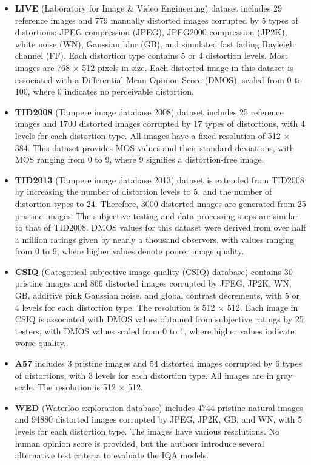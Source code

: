 \vspace{\baselineskip}
\begin{itemize}
    \item \textbf{LIVE} (Laboratory for Image \& Video Engineering) dataset \autocite{LIVE} includes 29 reference images and 779 manually distorted images corrupted by 5 types of distortions: JPEG compression (JPEG), JPEG2000 compression (JP2K), white noise (WN), Gaussian blur (GB), and simulated fast fading Rayleigh channel (FF). Each distortion type contains 5 or 4 distortion levels. Most images are 768 $\times$ 512 pixels in size. Each distorted image in this dataset is associated with a Differential Mean Opinion Score (DMOS), scaled from 0 to 100, where 0 indicates no perceivable distortion. 
    \item \textbf{TID2008} (Tampere image database 2008) dataset \autocite{TID2008} includes 25 reference images and 1700 distorted images corrupted by 17 types of distortions, with 4 levels for each distortion type. All images have a fixed resolution of 512 $\times$ 384. This dataset provides MOS values and their standard deviations, with MOS ranging from 0 to 9, where 9 signifies a distortion-free image.
    \item \textbf{TID2013} (Tampere image database 2013) dataset \autocite{TID2013} is extended from TID2008 \autocite{TID2008} by increasing the number of distortion levels to 5, and the number of distortion types to 24. Therefore, 3000 distorted images are generated from 25 pristine images. The subjective testing and data processing steps are similar to that of TID2008. DMOS values for this dataset were derived from over half a million ratings given by nearly a thousand observers, with values ranging from 0 to 9, where higher values denote poorer image quality.
    \item \textbf{CSIQ} (Categorical subjective image quality (CSIQ) database) \autocite{CSIQ} contains 30 pristine images and 866 distorted images corrupted by JPEG, JP2K, WN, GB, additive pink Gaussian noise, and global contrast decrements, with 5 or 4 levels for each distortion type. The resolution is 512 $\times$ 512. Each image in CSIQ is associated with DMOS values obtained from subjective ratings by 25 testers, with DMOS values scaled from 0 to 1, where higher values indicate worse quality.
    \item \textbf{A57} \autocite{A57} includes 3 pristine images and 54 distorted images corrupted by 6 types of distortions, with 3 levels for each distortion type. All images are in gray scale. The resolution is 512 $\times$ 512. 
    \item \textbf{WED} (Waterloo exploration database) \autocite{WED} includes 4744 pristine natural images and 94880 distorted images corrupted by JPEG, JP2K, GB, and WN, with 5 levels for each distortion type. The images have various resolutions. No human opinion score is provided, but the authors introduce several alternative test criteria to evaluate the IQA models.
\end{itemize}

